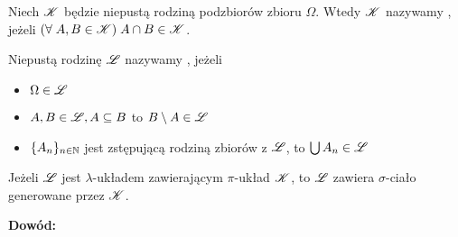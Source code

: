 \begin{definicja}[$\pi$-układ]
Niech $\mathcal{K}$ będzie niepustą rodziną podzbiorów zbioru $\Omega$. Wtedy $\mathcal{K}$ nazywamy , jeżeli $(\forall\;A,B\in\mathcal{K})\;A\cap B\in\mathcal{K}$.
\end{definicja}

\begin{definicja}
Niepustą rodzinę $\mathcal{L}$ nazywamy , jeżeli
\begin{itemize}
    \item $\Omega\in\mathcal{L}$
    \item $A,B\in\mathcal{L}, A\subseteq B$ to $B\setminus A\in\mathcal{L}$
    \item $\{A_n\}_{n\in\mathbb{N}}$ jest zstępującą rodziną zbiorów z $\mathcal{L}$, to $\bigcup A_n\in\mathcal{L}$
\end{itemize}
\end{definicja}

\begin{lemat}
Jeżeli $\mathcal{L}$ jest $\lambda$-układem zawierającym $\pi$-układ $\mathcal{K}$, to $\mathcal{L}$ zawiera $\sigma$-ciało generowane przez $\mathcal{K}$.
\end{lemat}

\textbf{Dowód:}

